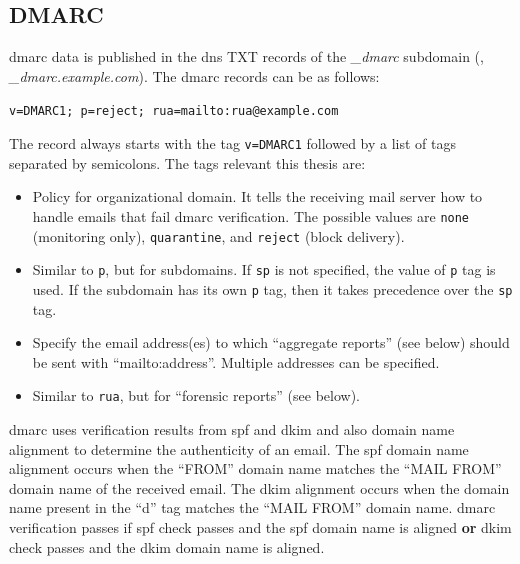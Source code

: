 \subsection{DMARC}
\acrfull{dmarc} data is published in the \gls{dns} TXT records of the \textit{\_dmarc} subdomain (\eg, \textit{\_dmarc.example.com}).
The \gls{dmarc} records can be as follows:

\begin{center}
    \texttt{v=DMARC1; p=reject; rua=mailto:rua@example.com}
\end{center}

The record always starts with the tag \texttt{v=DMARC1} followed by a list of tags separated by semicolons.
The tags relevant this thesis are:
\begin{itemize}
    \item[p] Policy for organizational domain. It tells the receiving mail server how to handle emails that fail \gls{dmarc} verification. The possible values are \texttt{none} (monitoring only), \texttt{quarantine}, and \texttt{reject} (block delivery).
    \item[sp] Similar to \texttt{p}, but for subdomains. If \texttt{sp} is not specified, the value of \texttt{p} tag is used. If the subdomain has its own \texttt{p} tag, then it takes precedence over the \texttt{sp} tag.
    \item[rua] Specify the email address(es) to which ``aggregate reports'' (see below) should be sent with ``mailto:address''. Multiple addresses can be specified.
    \item[ruf] Similar to \texttt{rua}, but for ``forensic reports'' (see below).
\end{itemize}

\gls{dmarc} uses verification results from \gls{spf} and \gls{dkim} and also domain name alignment to determine the authenticity of an email.
The \gls{spf} domain name alignment occurs when the ``FROM'' domain name matches the ``MAIL FROM'' domain name of the received email.
The \gls{dkim} alignment occurs when the domain name present in the ``d'' tag matches the ``MAIL FROM'' domain name.
\gls{dmarc} verification passes if \gls{spf} check passes and the \gls{spf} domain name is aligned \textbf{or} \gls{dkim} check passes and the \gls{dkim} domain name is aligned.

